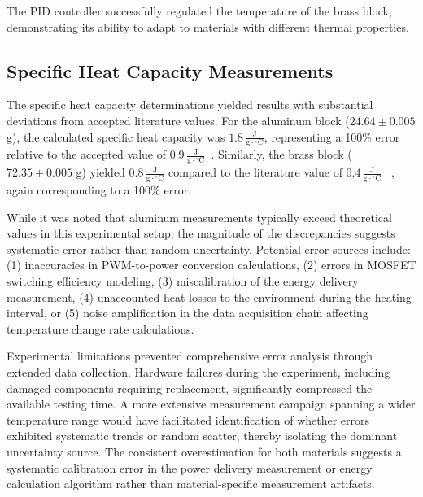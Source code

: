 The PID controller successfully regulated the temperature of the brass block,
demonstrating its ability to adapt to materials with different thermal properties.

\subsection{Specific Heat Capacity Measurements}
\label{subsec:specific-heat-capacity-measurements}

The specific heat capacity determinations yielded results with substantial
deviations from accepted literature values.
For the aluminum block (\(24.64 \pm 0.005\) g), the calculated specific heat
capacity was \(1.8 \, \frac{\text{J}}{\text{g}\cdot{}^\circ\text{C}}\),
representing a 100\% error relative to the accepted value of
\(0.9 \, \frac{\text{J}}{\text{g}\cdot{}^\circ\text{C}}\)~\cite{specific_heat}.
Similarly, the brass block (\(72.35 \pm 0.005\) g) yielded
\(0.8 \, \frac{\text{J}}{\text{g}\cdot{}^\circ\text{C}}\) compared to the
literature value of \(0.4 \, \frac{\text{J}}{\text{g}\cdot{}^\circ\text{C}}\)
~\cite{specific_heat}, again corresponding to a 100\% error.

While it was noted that aluminum measurements typically exceed
theoretical values in this experimental setup, the magnitude of the
discrepancies suggests systematic error rather than random uncertainty.
Potential error sources include: (1) inaccuracies in PWM-to-power conversion
calculations, (2) errors in MOSFET switching efficiency modeling, (3)
miscalibration of the energy delivery measurement, (4) unaccounted heat losses
to the environment during the heating interval, or (5) noise amplification in
the data acquisition chain affecting temperature change rate calculations.

Experimental limitations prevented comprehensive error analysis through
extended data collection.
Hardware failures during the experiment, including damaged components
requiring replacement, significantly compressed the available testing time.
A more extensive measurement campaign spanning a wider temperature range would
have facilitated identification of whether errors exhibited systematic trends
or random scatter, thereby isolating the dominant uncertainty source.
The consistent overestimation for both materials suggests a systematic
calibration error in the power delivery measurement or energy calculation
algorithm rather than material-specific measurement artifacts.
